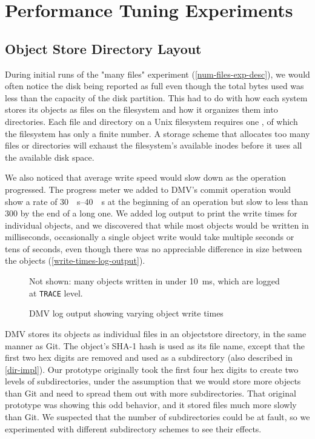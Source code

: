 \chapter{Performance Tuning Experiments}

\section{Object Store Directory Layout}
\label{dir-experiment}

During initial runs of the "many files" experiment
(\autoref{num-files-exp-desc}), we would often notice the disk being reported as
full even though the total bytes used was less than the capacity of the disk
partition. This had to do with how each system stores its objects as files on
the filesystem and how it organizes them into directories. Each file and
directory on a Unix filesystem requires one , of which the
filesystem has only a finite number. A storage scheme that allocates too many
files or directories will exhaust the filesystem's available inodes before it
uses all the available disk space.

We also noticed that average write speed would slow down as the operation
progressed. The progress meter we added to \gls{DMV}'s \gls{commit} operation
would show a rate of \SIrange{30}{40}{\mib\s} at the beginning of an operation
but slow to less than \SI{300}{\kib} by the end of a long one. We added log
output to print the write times for individual objects, and we discovered that
while most objects would be written in milliseconds, occasionally a single
object write would take multiple seconds or tens of seconds, even though there
was no appreciable difference in size between the objects
(\autoref{write-times-log-output}).

\begin{figure}
    \caption{DMV log output showing varying object write times}
    \label{write-times-log-output}
    \centering

    Not shown: many objects written in under \SI{10}{\ms}, which are logged at
    \lstinline{TRACE} level.

    
\end{figure}

\gls{DMV} stores its objects as individual files in an \gls{objectstore}
directory, in the same manner as Git. The object's SHA-1 hash is used as its
file name, except that the first two hex digits are removed and used as a
subdirectory (also described in \autoref{dir-impl}). Our prototype originally
took the first four hex digits to create two levels of subdirectories, under the
assumption that we would store more objects than Git and need to spread them out
with more subdirectories. That original prototype was showing this odd behavior,
and it stored files much more slowly than Git. We suspected that the number of
subdirectories could be at fault, so we experimented with different subdirectory
schemes to see their effects.


